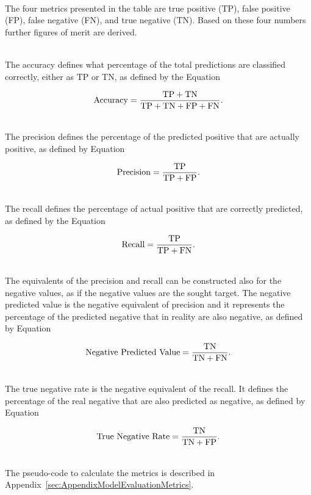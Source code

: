 \ \\The four metrics presented in the table are true positive (TP), false positive (FP), false negative (FN), and true negative (TN). Based on these four numbers further figures of merit are derived.

\ \\The accuracy defines what percentage of the total predictions are classified correctly, either as TP or TN, as defined by the Equation

\begin{equation}
   \Accuracy = \frac{\TP + \TN}{\TP + \TN + \FP + \FN}.
\end{equation}

\ \\The precision defines the percentage of the predicted positive that are actually positive, as defined by Equation

\begin{equation}
   \Precision = \frac{\TP}{\TP + \FP}.
\end{equation}

\ \\The recall defines the percentage of actual positive that are correctly predicted, as defined by the Equation

\begin{equation}
   \Recall = \frac{\TP}{\TP + \FN}.
\end{equation}

\ \\ The equivalents of the precision and recall can be constructed also for the negative values, as if the negative values are the sought target. The negative predicted value is the negative equivalent of precision and it represents the percentage of the predicted negative that in reality are also negative, as defined by Equation

\begin{equation}
   \NegativePredictedValue = \frac{\TN}{\TN + \FN}.
\end{equation}

\ \\The true negative rate is the negative equivalent of the recall. It defines the percentage of the real negative that are also predicted as negative, as defined by Equation 

\begin{equation}
   \TrueNegativeRate = \frac{\TN}{\TN + \FP}.
\end{equation} 

\ \\The pseudo-code to calculate the metrics is described in Appendix~\ref{sec:AppendixModelEvaluationMetrics}. 

